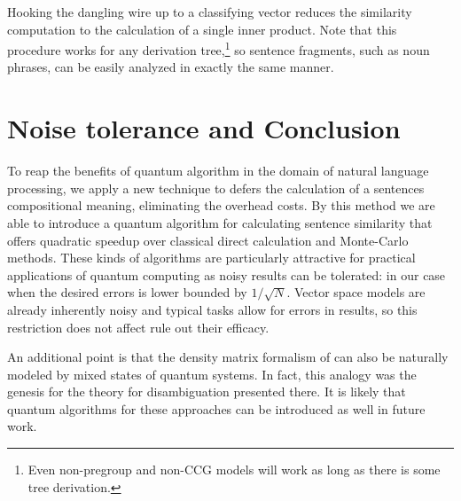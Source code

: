 \noindent Hooking the dangling wire up to a classifying vector reduces the similarity computation to the calculation of a single inner product. Note that this procedure works for any derivation tree,\footnote{Even non-pregroup and non-CCG models will work as long as there is some tree derivation.} so sentence fragments, such as noun phrases, can be easily analyzed in exactly the same manner.

\section{Noise tolerance and Conclusion}

To reap the benefits of quantum algorithm in the domain of natural language processing, we  apply a new technique to defers the calculation of a sentences compositional meaning, eliminating the overhead costs. By this method we are able to introduce a quantum algorithm for calculating sentence similarity that offers quadratic speedup over classical direct calculation and Monte-Carlo methods. These kinds of algorithms are particularly attractive for practical applications of quantum computing as noisy results can be tolerated: in our case when the desired errors is lower bounded by $1/\sqrt{N}$.  Vector space models are already inherently noisy and typical tasks allow for errors in results, so this restriction does not affect rule out their efficacy. 

An additional point is that the density matrix formalism of \cite{piedeleu2015open} can also be naturally modeled by mixed states of quantum systems.  In fact, this analogy was the genesis for the theory for disambiguation presented there. It is likely that quantum algorithms for these approaches can be introduced as well in future work.
